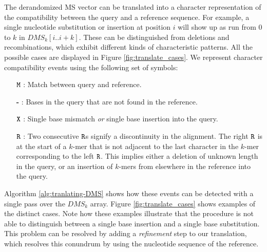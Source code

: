 \documentclass[unnumsec,webpdf,modern,large]{biorxiv}%
\theoremstyle{thmstyleone}%
\theoremstyle{thmstyletwo}%
\theoremstyle{thmstylethree}%
\begin{document}
The derandomized MS vector can be translated into a character representation of the compatibility between the query and a reference sequence. For example, a single nucleotide substitution or insertion at position $i$ will show up as run from 0 to $k$ in $DMS_k[i..i+k]$. These can be distinguished from deletions and recombinations, which exhibit different kinds of characteristic patterns. All the possible cases are displayed in Figure \ref{fig:translate_cases}. We represent character compatibility events using the following set of symbols:
\begin{enumerate}
\item[\textbf{$\tt{M}$}]: Match between query and reference.
\item[\textbf{-}]: Bases in the query that are not found in the reference.
\item[\textbf{$\tt{X}$}]: Single base mismatch \textit{or} single base insertion into the query.
\item[\textbf{$\tt{R}$}]: Two consecutive ${\tt R}$s signify a discontinuity in the alignment. The right ${\tt R}$ is at the start of a $k$-mer that is not adjacent to the last character in the $k$-mer corresponding to the left ${\tt R}$. This implies either a deletion of unknown length in the query, or an insertion of $k$-mers from elsewhere in the reference into the query.
\end{enumerate}
Algorithm \ref{alg:tranlating-DMS} shows how these events can be detected with a single pass over the $DMS_k$ array. Figure \ref{fig:translate_cases} shows examples of the distinct cases. Note how these examples illustrate that the procedure is not able to distinguish between a single base insertion and a single base substitution. This problem can be resolved by adding a \textit{refinement} step to our translation, which resolves this conundrum by using the nucleotide sequence of the reference.

\end{document}

